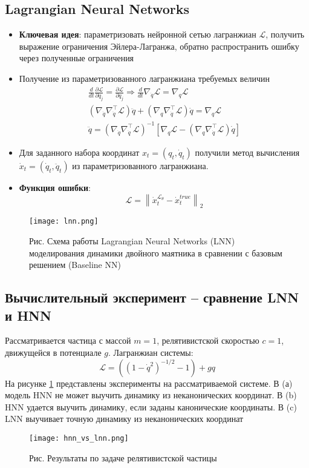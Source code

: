 \subsection{Lagrangian Neural Networks}

\begin{itemize}
	\item \textbf{Ключевая идея}: параметризовать нейронной сетью лагранжиан $\mathcal{L}$, получить выражение ограничения Эйлера-Лагранжа, обратно распространить ошибку через полученные ограничения
	\item Получение из параметризованного лагранжиана требуемых величин	$$
	\begin{aligned}
	\frac{d}{d t} \frac{\partial \mathcal{L}}{\partial \dot{q}_{j}} =\frac{\partial \mathcal{L}}{\partial q_{j}}  \Rightarrow \frac{d}{d t} \nabla_{\dot{q}} \mathcal{L} =\nabla_{q} \mathcal{L} \\
	\left(\nabla_{\dot{q}} \nabla_{\dot{q}}^{\top} \mathcal{L}\right) \ddot{q}+\left(\nabla_{q} \nabla_{\dot{q}}^{\top} \mathcal{L}\right) \dot{q} =\nabla_{q} \mathcal{L} \\
	\ddot{q} =\left(\nabla_{\dot{q}} \nabla_{\dot{q}}^{\top} \mathcal{L}\right)^{-1}\left[\nabla_{q} \mathcal{L}-\left(\nabla_{q} \nabla_{\dot{q}}^{\top} \mathcal{L}\right) \dot{q}\right]
	\end{aligned}
	$$
	\item Для заданного набора координат $x_t = (q_t, \dot{q}_t)$ получили метод вычисления $\dot{x}_t = (\dot{q}_t, \ddot{q}_t)$ из параметризованного лагранжиана.
	\item \textbf{Функция ошибки}: $$\mathcal{L} = \left\|\dot{x}^{\mathcal{L_{\theta}}}_t -\dot{x}^{true}_t\right\|_{2}$$
\end{itemize}

\begin{figure}[h]
	\centering
	\texttt{[image: lnn.png]}
	\caption{Рис. Схема работы Lagrangian Neural Networks (LNN) моделирования динамики двойного маятника в сравнении с базовым решением (Baseline NN)}
\end{figure}

\subsection{Вычислительный эксперимент -- сравнение LNN и HNN}
Рассматривается частица с массой $m=1$, релятивистской скоростью $c=1$, движущейся в потенциале $g$. Лагранжиан системы: 
$$\mathcal{L}=\left(\left(1-\dot{q}^{2}\right)^{-1 / 2}-1\right)+g q$$
На рисунке \ref{hnn_vs_lnn} представлены эксперименты на рассматриваемой системе. В (а) модель HNN не может выучить динамику из неканонических координат. В (b) HNN удается выучить динамику, если заданы канонические координаты. В (c) LNN выучивает точную динамику из неканонических координат
\begin{figure}[h]
	\centering
	\label{hnn_vs_lnn}
	\texttt{[image: hnn\_vs\_lnn.png]}
	\caption{Рис. Результаты по задаче релятивистской частицы}
\end{figure}	
\newpage
